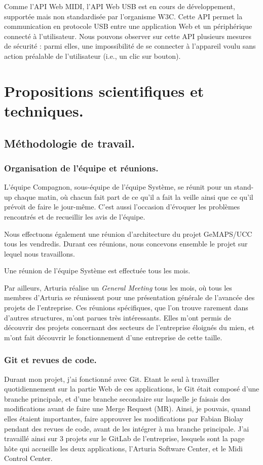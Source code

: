 \documentclass[francais]{rapportPFE}  %
\begin{document}
Comme l'API Web MIDI, l'API Web USB \cite{webusb1}
est en cours de développement, supportée mais non standardisée par l'organisme W3C. Cette API permet la communication en protocole USB entre une application Web et un périphérique connecté à l'utilisateur.
Nous pouvons observer sur cette API plusieurs mesures de sécurité \cite{webusb2}
 : parmi elles, une impossibilité de se connecter à l'appareil voulu sans action préalable de l'utilisateur (i.e., un clic sur bouton).


\section{Propositions scientifiques et techniques.}
\subsection{Méthodologie de travail.}
\subsubsection{Organisation de l'équipe et réunions.}
L'équipe Compagnon, sous-équipe de l'équipe Système, se réunit pour un stand-up chaque matin, où chacun fait part de ce qu'il a fait la veille ainsi que ce qu'il prévoit de faire le jour-même. C'est aussi l'occasion d'évoquer les problèmes rencontrés et de recueillir les avis de l'équipe.

Nous effectuons également une réunion d'architecture du projet GeMAPS/UCC tous les vendredis. Durant ces réunions, nous concevons ensemble le projet sur lequel nous travaillons. 

Une réunion de l'équipe Système est effectuée tous les mois.

Par ailleurs, Arturia réalise un \textit{General Meeting} tous les mois, où tous les membres d'Arturia se réunissent pour une présentation générale de l'avancée des projets de l'entreprise. Ces réunions spécifiques, que l'on trouve rarement dans d'autres structures, m'ont parues très intéressants. Elles m'ont permis de découvrir des projets concernant des secteurs de l'entreprise éloignés du mien, et m'ont fait découvrir le fonctionnement d'une entreprise de cette taille.


\subsubsection{Git et revues de code.}
Durant mon projet, j'ai fonctionné avec Git. Etant le seul à travailler quotidiennement sur la partie Web de ces applications, le Git était composé d'une branche principale, et d'une branche secondaire sur laquelle je faisais des modifications avant de faire une Merge Request (MR). Ainsi, je pouvais, quand elles étaient importantes, faire approuver les modifications par Fabian Biolay pendant des revues de code, avant de les intégrer à ma branche principale. J'ai travaillé ainsi sur 3 projets sur le GitLab de l'entreprise, lesquels sont la page hôte qui accueille les deux applications, l'Arturia Software Center, et le Midi Control Center.
\end{document}
